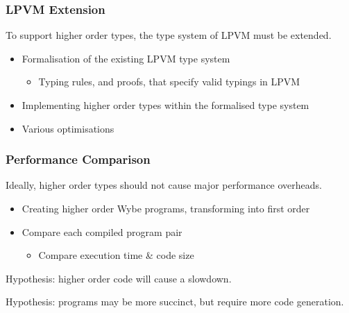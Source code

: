 \documentclass{beamer}
\begin{document}
\begin{frame}
  \frametitle{LPVM Extension}

  To support higher order types, the type system of LPVM must be extended.

  \vspace{2em}

  \begin{itemize}
    \item Formalisation of the existing LPVM type system
    \begin{itemize}
      \item Typing rules, and proofs, that specify valid typings in LPVM
    \end{itemize}
    \item Implementing higher order types within the formalised type system
    \item Various optimisations
  \end{itemize}
\end{frame}

\begin{frame}
  \frametitle{Performance Comparison}

  Ideally, higher order types should not cause major performance overheads.

  \vspace{2em}
  
  \begin{itemize}
    \item Creating higher order Wybe programs, transforming into first order
    \item Compare each compiled program pair
    \begin{itemize}
      \item Compare execution time \& code size
    \end{itemize}
  \end{itemize}

  \vspace{2em}

  Hypothesis: higher order code will cause a slowdown. 

  \vspace{1em}

  Hypothesis: programs may be more succinct, but require more code generation.
    
\end{frame}
\end{document}
